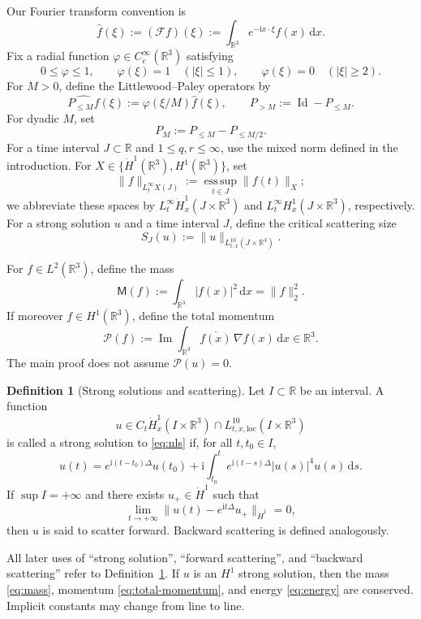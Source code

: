 \documentclass{interact}
\numberwithin{equation}{section}
\theoremstyle{plain}
\theoremstyle{definition}
\newtheorem{definition}[theorem]{Definition}
\theoremstyle{remark}
\newcommand{\R}{\mathbb R}
\newcommand{\ii}{\mathrm i}
\newcommand{\Ima}{\operatorname{Im}}
\newcommand{\M}{\mathsf M}
\newcommand{\F}{\mathcal F}
\newcommand{\dd}{\,\mathrm d}
\begin{document}
Our Fourier transform convention is
\[
 \widehat f(\xi):=(\F f)(\xi)
 :=\int_{\R^3}e^{-\ii x\cdot\xi}f(x)\dd x.
\]
Fix a radial function $\varphi\in C_c^\infty(\R^3)$ satisfying
\[
 0\le\varphi\le1,
 \qquad
 \varphi(\xi)=1\quad(|\xi|\le1),
 \qquad
 \varphi(\xi)=0\quad(|\xi|\ge2).
\]
For $M>0$, define the Littlewood--Paley operators by
\[
 \widehat{P_{\le M}f}(\xi):=\varphi(\xi/M)\widehat f(\xi),
 \qquad
 P_{>M}:=\operatorname{Id}-P_{\le M}.
\]
For dyadic $M$, set
\[
 P_M:=P_{\le M}-P_{\le M/2}.
\]
For a time interval $J\subset\R$ and $1\le q,r\le\infty$, use the mixed norm defined in the introduction. For $X\in\{\dot H^1(\R^3),H^1(\R^3)\}$, set
\[
 \|f\|_{L_t^\infty X(J)}:=\operatorname*{ess\,sup}_{t\in J}\|f(t)\|_X;
\]
we abbreviate these spaces by $L_t^\infty\dot H_x^1(J\times\R^3)$ and $L_t^\infty H_x^1(J\times\R^3)$, respectively. For a strong solution $u$ and a time interval $J$, define the critical scattering size
\[
 S_J(u):=\|u\|_{L_{t,x}^{10}(J\times\R^3)}.
\]

For $f\in L^2(\R^3)$, define the mass
\begin{equation}\label{eq:mass}
 \M(f):=\int_{\R^3}|f(x)|^2\dd x=\|f\|_2^2.
\end{equation}
If moreover $f\in H^1(\R^3)$, define the total momentum
\begin{equation}\label{eq:total-momentum}
 \mathcal P(f):=\Ima\int_{\R^3}\overline{f(x)}\,\nabla f(x)\dd x\in\R^3.
\end{equation}
The main proof does not assume $\mathcal P(u)=0$.

\begin{definition}[Strong solutions and scattering]\label{def:strong-scatter}
Let $I\subset\R$ be an interval. A function
\[
 u\in C_t\dot H_x^1(I\times\R^3)
 \cap L^{10}_{t,x,\mathrm{loc}}(I\times\R^3)
\]
is called a strong solution to \eqref{eq:nls} if, for all $t,t_0\in I$,
\[
 u(t)=e^{\ii(t-t_0)\Delta}u(t_0)
 +\ii\int_{t_0}^t e^{\ii(t-s)\Delta}|u(s)|^4u(s)\dd s.
\]
If $\sup I=+\infty$ and there exists $u_+\in\dot H^1$ such that
\[
 \lim_{t\to+\infty}
 \|u(t)-e^{\ii t\Delta}u_+\|_{\dot H^1}=0,
\]
then $u$ is said to scatter forward. Backward scattering is defined analogously.
\end{definition}
All later uses of ``strong solution'', ``forward scattering'', and ``backward scattering'' refer to Definition~\ref{def:strong-scatter}. If $u$ is an $H^1$ strong solution, then the mass \eqref{eq:mass}, momentum \eqref{eq:total-momentum}, and energy \eqref{eq:energy} are conserved. Implicit constants may change from line to line.
\end{document}
